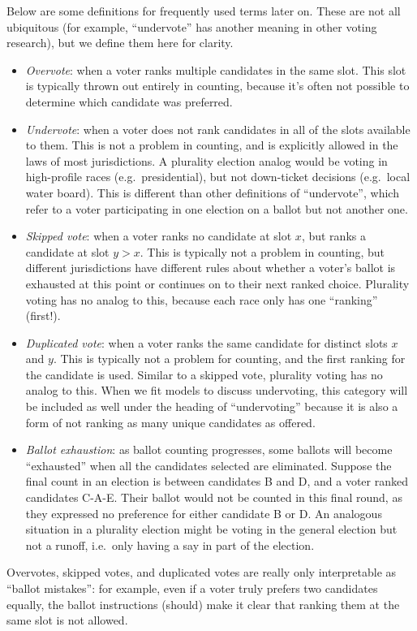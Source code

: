 \documentclass[12pt,twoside]{reedthesis}
\begin{document}
Below are some definitions for frequently used terms later on. These are not all ubiquitous (for example, ``undervote'' has another meaning in other voting research), but we define them here for clarity.
\begin{itemize}
\item
  \emph{Overvote}: when a voter ranks multiple candidates in the same slot. This slot is typically thrown out entirely in counting, because it's often not possible to determine which candidate was preferred.
\item
  \emph{Undervote}: when a voter does not rank candidates in all of the slots available to them. This is not a problem in counting, and is explicitly allowed in the laws of most jurisdictions. A plurality election analog would be voting in high-profile races (e.g.~presidential), but not down-ticket decisions (e.g.~local water board). This is different than other definitions of ``undervote'', which refer to a voter participating in one election on a ballot but not another one.
\item
  \emph{Skipped vote}: when a voter ranks no candidate at slot \(x\), but ranks a candidate at slot \(y > x\). This is typically not a problem in counting, but different jurisdictions have different rules about whether a voter's ballot is exhausted at this point or continues on to their next ranked choice. Plurality voting has no analog to this, because each race only has one ``ranking'' (first!).
\item
  \emph{Duplicated vote}: when a voter ranks the same candidate for distinct slots \(x\) and \(y\). This is typically not a problem for counting, and the first ranking for the candidate is used. Similar to a skipped vote, plurality voting has no analog to this. When we fit models to discuss undervoting, this category will be included as well under the heading of ``undervoting'' because it is also a form of not ranking as many unique candidates as offered.
\item
  \emph{Ballot exhaustion}: as ballot counting progresses, some ballots will become ``exhausted'' when all the candidates selected are eliminated. Suppose the final count in an election is between candidates B and D, and a voter ranked candidates C-A-E. Their ballot would not be counted in this final round, as they expressed no preference for either candidate B or D. An analogous situation in a plurality election might be voting in the general election but not a runoff, i.e.~only having a say in part of the election.
\end{itemize}
Overvotes, skipped votes, and duplicated votes are really only interpretable as ``ballot mistakes'': for example, even if a voter truly prefers two candidates equally, the ballot instructions (should) make it clear that ranking them at the same slot is not allowed.
\end{document}
